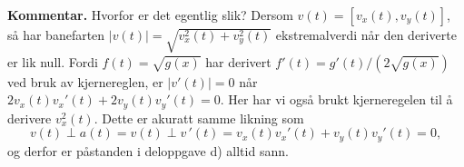 \textbf{Kommentar.}
Hvorfor er det egentlig slik?
Dersom $v(t) = [v_x(t), v_y(t)]$, så har banefarten $|v(t)| = \sqrt{v_x^2(t) +  v_y^2(t)}$ ekstremalverdi når den deriverte er lik null.
Fordi $f(t) = \sqrt{g(x)}$ har derivert $f'(t) = g'(t) / (2 \sqrt{g(x)})$ ved bruk av kjernereglen, er $|v ' (t)| = 0$ når $2v_x(t) v_x'(t) +  2v_y(t) v_y'(t) = 0$. Her har vi også brukt kjerneregelen til å derivere $v_x^2(t)$.
Dette er akuratt samme likning som 
\begin{equation*}
	v(t) \perp a(t) = v(t) \perp v \, '(t) = v_x(t) v_x ' (t) + v_y(t) v_y ' (t) = 0,
\end{equation*}
og derfor er påstanden i deloppgave d) alltid sann.







